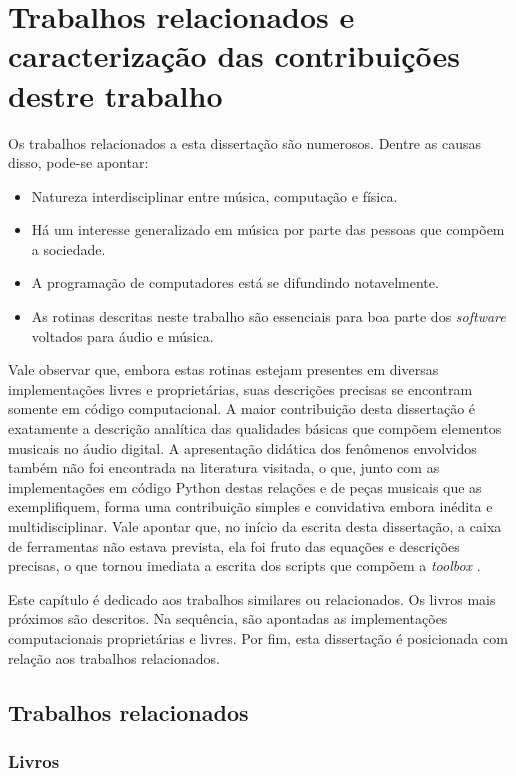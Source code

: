 \chapter{Trabalhos relacionados e caracterização das contribuições destre trabalho}
\label{cap:trabalhosRelacionados}

Os trabalhos relacionados a esta dissertação são numerosos. Dentre as causas disso, pode-se apontar:

\begin{itemize}
    \item Natureza interdisciplinar entre música, computação e física.
    \item Há um interesse generalizado em música por parte das pessoas que compõem a sociedade.
    \item A programação de computadores está se difundindo notavelmente.
    \item As rotinas descritas neste trabalho são essenciais para boa parte dos \emph{software} voltados para áudio e música.
\end{itemize}

Vale observar que, embora estas rotinas estejam presentes em diversas implementações livres e proprietárias, suas descrições precisas se encontram somente em código computacional. A maior contribuição desta dissertação é exatamente a descrição analítica das qualidades básicas que compõem elementos musicais no áudio digital. A apresentação didática dos fenômenos envolvidos também não foi encontrada na literatura visitada, o que, junto com as implementações em código Python destas relações e de peças musicais que as exemplifiquem, forma uma contribuição simples e convidativa embora inédita e multidisciplinar. Vale apontar que, no início da escrita desta dissertação, a caixa de ferramentas não estava prevista, ela foi fruto das equações e descrições precisas, o que tornou imediata a escrita dos scripts que compõem a \emph{toolbox} \massa.

Este capítulo é dedicado aos trabalhos similares ou relacionados. Os livros mais próximos são descritos. Na sequência, são apontadas as implementações computacionais proprietárias e livres. Por fim, esta dissertação é posicionada com relação aos trabalhos relacionados.

\section{Trabalhos relacionados}

\subsection{Livros}\label{subsec:livros}

